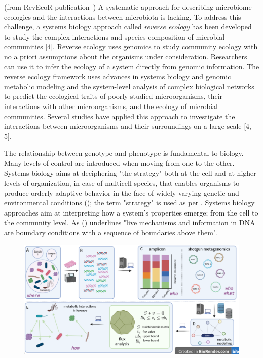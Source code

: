    (from RevEcoR publication~\cite{cao2016revecor})
   A systematic approach for describing microbiome ecologies and the interactions between microbiota is lacking. 
   To address this challenge, a systems biology approach called \textit{reverse ecology} has been developed 
   to study the complex interactions and species composition of microbial communities [4]. 
   Reverse ecology uses genomics to study community ecology with no a priori assumptions about the organisms under consideration. 
   Researchers can use it to infer the ecology of a system directly from genomic information. 
   The reverse ecology framework uses advances in systems biology and genomic metabolic modeling and 
   the system-level analysis of complex biological networks to predict the ecological traits of poorly studied microorganisms, 
   their interactions with other microorganisms, and the ecology of microbial communities. 
   Several studies have applied this approach to investigate the interactions between microorganisms 
   and their surroundings on a large scale [4, 5].

   The relationship between genotype and phenotype is fundamental to biology.
   Many levels of control are introduced when moving from one to the other. 
   Systems biology aims at deciphering "the strategy" both at the cell and at higher levels of organization, in case of multicell species, that enables organisms to produce orderly adaptive behavior in the face of widely varying genetic and environmental conditions (\cite{strohman2002maneuvering}); 
   the term "strategy" is used as per \cite{polanyi1968life}.
   Systems biology approaches aim at interpreting how a system's properties emerge; 
   from the cell to the community level.
   As \citeauthor{polanyi1968life} (\citeyear{polanyi1968life}) underlines 
   "live mechanisms and information in DNA are boundary conditions with a sequence of boundaries above them". 

   \begin{figure}[h]
      \centering
      \includegraphics[width=135mm]{figures/Selection_935.png}
      \caption[Reverse ecology approach]{}
   \end{figure}



